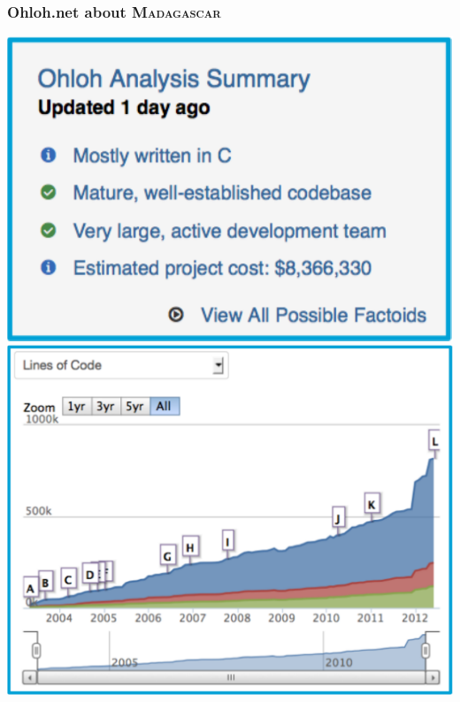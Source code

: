 \begin{frame}
\MadLogo
\frametitle{Ohloh.net about \textsc{Madagascar}}

\begin{minipage}{0.65\textwidth}
  \includegraphics[height=0.3\textheight]{Fig/ohloh0} 
  \includegraphics[width=\textwidth]{Fig/ohloh1}
\end{minipage}


\end{frame}

